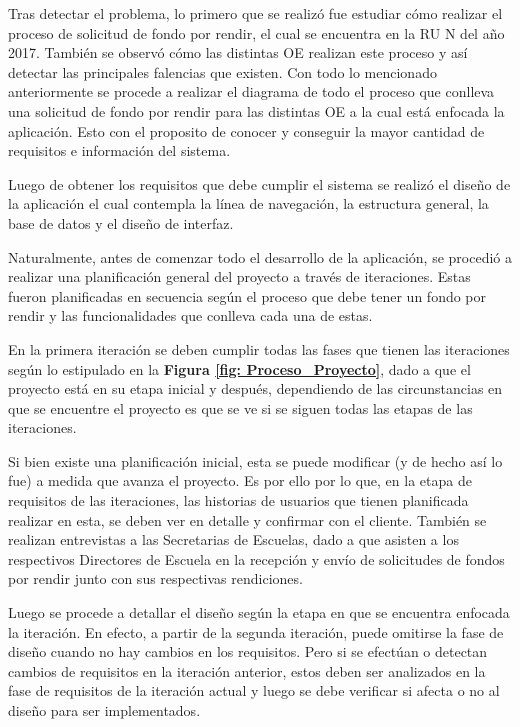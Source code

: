 Tras detectar el problema, lo primero que se realizó fue estudiar cómo realizar el proceso de solicitud de fondo por rendir, el cual se encuentra en la RU N del año 2017. También se observó cómo las distintas OE realizan este proceso y así detectar las principales falencias que existen. Con todo lo mencionado anteriormente se procede a realizar el diagrama de todo el proceso que conlleva una solicitud de fondo por rendir para las distintas OE a la cual está enfocada la aplicación. Esto con el proposito de conocer y conseguir la mayor cantidad de requisitos e información del sistema.

Luego de obtener los requisitos que debe cumplir el sistema se realizó el diseño de la aplicación el cual contempla la línea de navegación, la estructura general, la base de datos y el diseño de interfaz.

Naturalmente, antes de comenzar todo el desarrollo de la aplicación, se procedió a realizar una planificación general del proyecto a través de iteraciones. Estas fueron planificadas en secuencia según el proceso que debe tener un fondo por rendir y las funcionalidades que conlleva cada una de estas.

En la primera iteración se deben cumplir todas las fases que tienen las iteraciones según lo estipulado en la \textbf{Figura \ref{fig: Proceso_Proyecto}}, dado a que el proyecto está en su etapa inicial y después, dependiendo de las circunstancias en que se encuentre el proyecto es que se ve si se siguen todas las etapas de las iteraciones. 

Si bien existe una planificación inicial, esta se puede modificar (y de hecho así lo fue) a medida que avanza el proyecto. Es por ello por lo que, en la etapa de requisitos de las iteraciones, las historias de usuarios que tienen planificada realizar en esta, se deben ver en detalle y confirmar con el cliente. También se realizan entrevistas a las Secretarias de Escuelas, dado a que asisten a los respectivos Directores de Escuela en la recepción y envío de solicitudes de fondos por rendir junto con sus respectivas rendiciones.

Luego se procede a detallar el diseño según la etapa en que se encuentra enfocada la iteración. En efecto, a partir de la segunda iteración, puede omitirse la fase de diseño cuando no hay cambios en los requisitos. Pero si se efectúan o detectan cambios de requisitos en la iteración anterior, estos deben ser analizados en la fase de requisitos de la iteración actual y luego se debe verificar si afecta o no al diseño para ser implementados.

